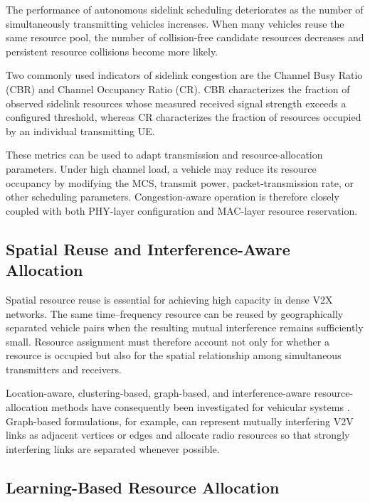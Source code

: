 The performance of autonomous sidelink scheduling deteriorates as the number
of simultaneously transmitting vehicles increases. When many vehicles reuse
the same resource pool, the number of collision-free candidate resources
decreases and persistent resource collisions become more likely.

Two commonly used indicators of sidelink congestion are the Channel Busy
Ratio (CBR) and Channel Occupancy Ratio (CR). CBR characterizes the fraction
of observed sidelink resources whose measured received signal strength
exceeds a configured threshold, whereas CR characterizes the fraction of
resources occupied by an individual transmitting UE.

These metrics can be used to adapt transmission and resource-allocation
parameters. Under high channel load, a vehicle may reduce its resource
occupancy by modifying the MCS, transmit power, packet-transmission rate, or
other scheduling parameters. Congestion-aware operation is therefore closely
coupled with both PHY-layer configuration and MAC-layer resource reservation.

\subsection{Spatial Reuse and Interference-Aware Allocation}

Spatial resource reuse is essential for achieving high capacity in dense V2X
networks. The same time--frequency resource can be reused by geographically
separated vehicle pairs when the resulting mutual interference remains
sufficiently small. Resource assignment must therefore account not only for
whether a resource is occupied but also for the spatial relationship among
simultaneous transmitters and receivers.

Location-aware, clustering-based, graph-based, and interference-aware
resource-allocation methods have consequently been investigated for
vehicular systems
\cite{abantoleon2017graph,cecchini2018reuse}. Graph-based formulations, for
example, can represent mutually interfering V2V links as adjacent vertices
or edges and allocate radio resources so that strongly interfering links are
separated whenever possible.

\subsection{Learning-Based Resource Allocation}

